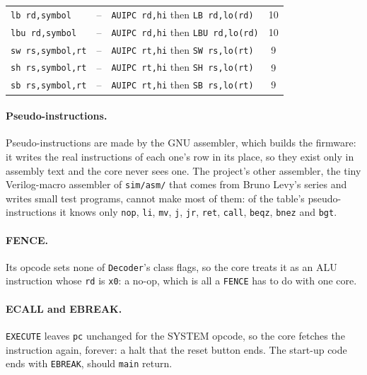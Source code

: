 \documentclass[11pt,a4paper]{report}
\begin{document}
\begin{footnotesize}
\begin{longtable}{@{}>{\raggedright\arraybackslash}p{3.3cm}c
    >{\raggedright\arraybackslash}p{8.4cm}c@{}}
  \texttt{lb rd,symbol} & -- & \texttt{AUIPC rd,hi} then \texttt{LB rd,lo(rd)} & 10 \\
  \texttt{lbu rd,symbol} & -- & \texttt{AUIPC rd,hi} then \texttt{LBU rd,lo(rd)} & 10 \\
  \texttt{sw rs,symbol,rt} & -- & \texttt{AUIPC rt,hi} then \texttt{SW rs,lo(rt)} & 9 \\
  \texttt{sh rs,symbol,rt} & -- & \texttt{AUIPC rt,hi} then \texttt{SH rs,lo(rt)} & 9 \\
  \texttt{sb rs,symbol,rt} & -- & \texttt{AUIPC rt,hi} then \texttt{SB rs,lo(rt)} & 9 \\
\end{longtable}
\end{footnotesize}

\paragraph{Pseudo-instructions.} Pseudo-instructions are made by the GNU assembler, which
builds the firmware: it writes the real instructions of each one's row in its place, so they
exist only in assembly text and the core never sees one. The project's other assembler, the
tiny Verilog-macro assembler of \texttt{sim/asm/} that comes from Bruno Levy's series and
writes small test programs, cannot make most of them: of the table's pseudo-instructions it
knows only \texttt{nop}, \texttt{li}, \texttt{mv}, \texttt{j}, \texttt{jr}, \texttt{ret},
\texttt{call}, \texttt{beqz}, \texttt{bnez} and \texttt{bgt}.

\paragraph{FENCE.} Its opcode sets none of \texttt{Decoder}'s class flags, so the core
treats it as an ALU instruction whose \texttt{rd} is \texttt{x0}: a no-op, which is all a
\texttt{FENCE} has to do with one core.

\paragraph{ECALL and EBREAK.} \texttt{EXECUTE} leaves \texttt{pc} unchanged for the SYSTEM
opcode, so the core fetches the instruction again, forever: a halt that the reset button
ends. The start-up code ends with \texttt{EBREAK}, should \texttt{main} return.
\end{document}
